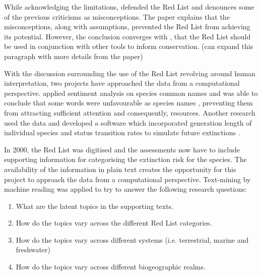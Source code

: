 While acknowledging the limitations, \textcite{rodrigues2006value} defended the Red List and denounces some of the previous criticisms as misconceptions. The paper explains that the misconceptions, along with assumptions, prevented the Red List from achieving its potential. However, the conclusion converges with \textcite{possingham2002limits}, that the Red List should be used in conjunction with other tools to inform conservation. (can expand this paragraph with more details from the paper)

With the discussion surrounding the use of the Red List revolving around human interpretation, two projects have approached the data from a computational perspective. \textcite{gregg2020many} applied sentiment analysis on species common names and was able to conclude that some words were unfavourable as species names \parencite{gregg2020many}, preventing them from attracting sufficient attention and consequently, resources. Another research used the data and developed a software which incorporated generation length of individual species and status transition rates to simulate future extinctions \parencite{andermann2021iucn_sim}.

In 2000, the Red List was digitised \parencite{iucn2021} and the assessments now have to include supporting information for categorising the extinction risk for the species.
The availability of the information in plain text creates the opportunity for this project to approach the data from a computational perspective. Text-mining by machine reading was applied to try to answer the following research questions:
\begin{enumerate}
    \item What are the latent topics in the supporting texts.
    \item How do the topics vary across the different Red List categories.
    \item How do the topics vary across different systems (i.e. terrestrial, marine and freshwater)
    \item How do the topics vary across different biogeographic realms.
\end{enumerate}
